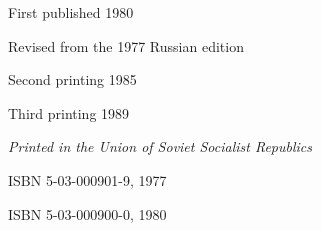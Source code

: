 \vspace{40pt}

\noindent
First published 1980

\noindent
Revised from the 1977 Russian edition

\noindent
Second printing 1985

\noindent
Third printing 1989




\vfill
\noindent
\textit{Printed in the Union of Soviet Socialist Republics}

\vspace{30pt}

\noindent
ISBN 5-03-000901-9, 1977

\noindent
ISBN 5-03-000900-0, 1980

\thispagestyle{empty}